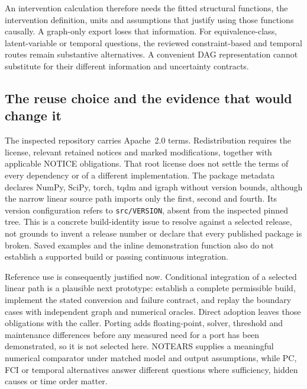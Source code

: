 An intervention calculation therefore needs the fitted structural functions,
the intervention definition, units and assumptions that justify using those
functions causally. A graph-only export loses that information. For
equivalence-class, latent-variable or temporal questions, the reviewed
constraint-based and temporal routes remain substantive alternatives. A
convenient DAG representation cannot substitute for their different
information and uncertainty contracts.

\subsection{The reuse choice and the evidence that would change it}

The inspected repository carries Apache~2.0 terms. Redistribution requires
the license, relevant retained notices and marked modifications, together
with applicable NOTICE obligations. That root license does not settle the
terms of every dependency or of a different implementation. The package
metadata declares NumPy, SciPy, torch, tqdm and igraph without version bounds,
although the narrow linear source path imports only the first, second and
fourth. Its version configuration refers to \texttt{src/VERSION}, absent
from the inspected pinned tree. This is a concrete build-identity issue to
resolve against a selected release, not grounds to invent a release number
or declare that every published package is broken. Saved examples and the
inline demonstration function also do not establish a supported build or
passing continuous integration.
\citep{exec16_dagma_primary}

Reference use is consequently justified now. Conditional integration of a
selected linear path is a plausible next prototype: establish a complete
permissible build, implement the stated conversion and failure contract,
and replay the boundary cases with independent graph and numerical oracles.
Direct adoption leaves those obligations with the caller. Porting adds
floating-point, solver, threshold and maintenance differences before any
measured need for a port has been demonstrated, so it is not selected here.
NOTEARS supplies a meaningful numerical comparator under matched model and
output assumptions, while PC, FCI or temporal alternatives answer different
questions where sufficiency, hidden causes or time order matter.

